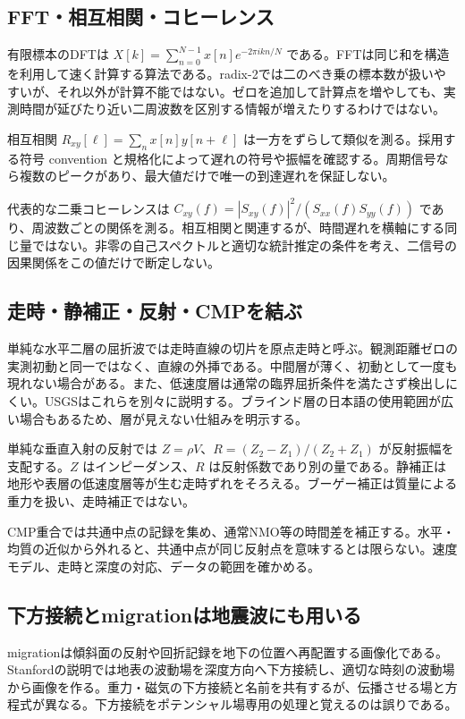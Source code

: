 \subsection{FFT・相互相関・コヒーレンス}
\label{theory:exploration:fft}
有限標本のDFTは \(X[k]=\sum_{n=0}^{N-1}x[n]e^{-2\pi i kn/N}\) である。FFTは同じ和を構造を利用して速く計算する算法である。radix-2では二のべき乗の標本数が扱いやすいが、それ以外が計算不能ではない\cite{scipy_fft}。ゼロを追加して計算点を増やしても、実測時間が延びたり近い二周波数を区別する情報が増えたりするわけではない。

\label{theory:exploration:correlation}
相互相関 \(R_{xy}[\ell]=\sum_n x[n]y[n+\ell]\) は一方をずらして類似を測る。採用する符号 convention と規格化によって遅れの符号や振幅を確認する。周期信号なら複数のピークがあり、最大値だけで唯一の到達遅れを保証しない。

代表的な二乗コヒーレンスは \(C_{xy}(f)=|S_{xy}(f)|^2/(S_{xx}(f)S_{yy}(f))\) であり、周波数ごとの関係を測る\cite{scipy_coherence}。相互相関と関連するが、時間遅れを横軸にする同じ量ではない。非零の自己スペクトルと適切な統計推定の条件を考え、二信号の因果関係をこの値だけで断定しない。

\subsection{走時・静補正・反射・CMPを結ぶ}
\label{theory:exploration:seismicterms}
単純な水平二層の屈折波では走時直線の切片を原点走時と呼ぶ。観測距離ゼロの実測初動と同一ではなく、直線の外挿である。中間層が薄く、初動として一度も現れない場合がある。また、低速度層は通常の臨界屈折条件を満たさず検出しにくい。USGSはこれらを別々に説明する\cite{usgs_refraction2013}。ブラインド層の日本語の使用範囲が広い場合もあるため、層が見えない仕組みを明示する。

単純な垂直入射の反射では \(Z=\rho V\)、\(R=(Z_2-Z_1)/(Z_2+Z_1)\) が反射振幅を支配する。\(Z\) はインピーダンス、\(R\) は反射係数であり別の量である\cite{epa_seismic_reflection}。静補正は地形や表層の低速度層等が生む走時ずれをそろえる\cite{usgs_static2004}。ブーゲー補正は質量による重力を扱い、走時補正ではない。

CMP重合では共通中点の記録を集め、通常NMO等の時間差を補正する。水平・均質の近似から外れると、共通中点が同じ反射点を意味するとは限らない。速度モデル、走時と深度の対応、データの範囲を確かめる。

\subsection{下方接続とmigrationは地震波にも用いる}
\label{theory:exploration:continuation}
migrationは傾斜面の反射や回折記録を地下の位置へ再配置する画像化である。Stanfordの説明では地表の波動場を深度方向へ下方接続し、適切な時刻の波動場から画像を作る\cite{stanford_downward2001}。重力・磁気の下方接続と名前を共有するが、伝播させる場と方程式が異なる。下方接続をポテンシャル場専用の処理と覚えるのは誤りである。

